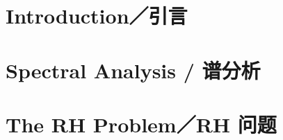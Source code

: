 \documentclass[lang=cn,scheme=chinese,mode=simple,device=normal,color=blue,math=cm,thmcnt=chapter,bibend=bibtex,12pt]{elegantbook}
\begin{document}
\frontmatter


\tableofcontents
\mainmatter
\chapter{Introduction／引言}

\chapter{Spectral Analysis / 谱分析}






\chapter{The RH Problem／RH 问题}




\backmatter

\end{document}
